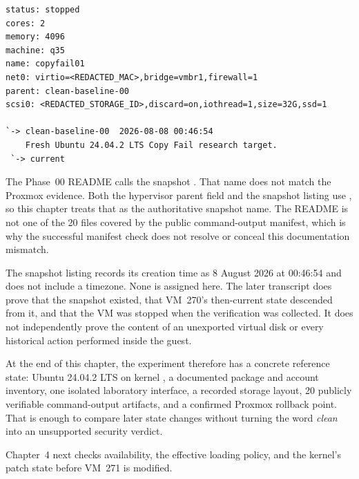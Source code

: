 \begin{lstlisting}
status: stopped
cores: 2
memory: 4096
machine: q35
name: copyfail01
net0: virtio=<REDACTED_MAC>,bridge=vmbr1,firewall=1
parent: clean-baseline-00
scsi0: <REDACTED_STORAGE_ID>,discard=on,iothread=1,size=32G,ssd=1

`-> clean-baseline-00  2026-08-08 00:46:54
    Fresh Ubuntu 24.04.2 LTS Copy Fail research target.
 `-> current
\end{lstlisting}

The Phase~00 README calls the snapshot . That name does
not match the Proxmox evidence. Both the hypervisor parent field and the
snapshot listing use , so this chapter treats that as
the authoritative snapshot name. The README is not one of the 20 files covered
by the public command-output manifest, which is why the successful manifest
check does not resolve or conceal this documentation mismatch.

The snapshot listing records its creation time as 8 August 2026 at 00:46:54
and does not include a timezone. None is assigned here. The later transcript
does prove that the snapshot existed, that VM~270's then-current state descended
from it, and that the VM was stopped when the verification was collected. It
does not independently prove the content of an unexported virtual disk or every
historical action performed inside the guest.

At the end of this chapter, the experiment therefore has a concrete reference
state: Ubuntu 24.04.2 LTS on kernel , a documented
package and account inventory, one isolated laboratory interface, a recorded
storage layout, 20 publicly verifiable command-output artifacts, and a confirmed
Proxmox rollback point. That is enough to compare later state changes without
turning the word \emph{clean} into an unsupported security verdict.

Chapter~4 next checks  availability, the effective loading
policy, and the kernel's patch state before VM~271 is modified.
